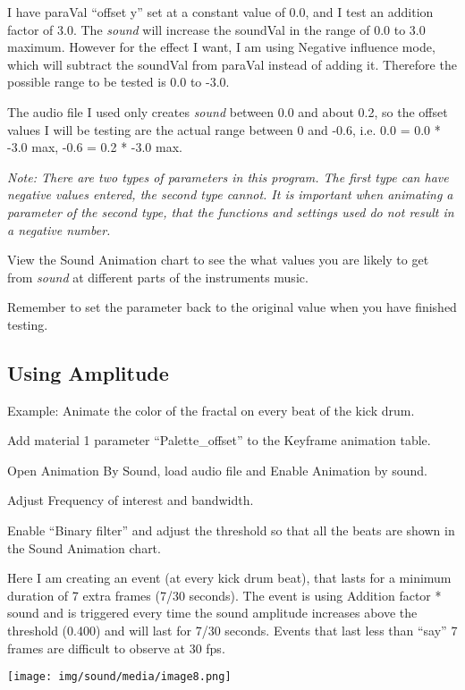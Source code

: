 I have paraVal ``offset y'' set at a constant value of 0.0, and I test
an addition factor of 3.0. The \emph{sound} will increase the soundVal
in the range of 0.0 to 3.0 maximum. However for the effect I want, I am
using Negative influence mode, which will subtract the soundVal from
paraVal instead of adding it. Therefore the possible range to be tested
is 0.0 to -3.0.

The audio file I used only creates \emph{sound} between 0.0 and about
0.2, so the offset values I will be testing are the actual range between
0 and -0.6, i.e. 0.0 = 0.0 * -3.0 max, -0.6 = 0.2 * -3.0 max.

\emph{Note: There are two types of parameters in this program. The first
type can have negative values entered, the second type cannot. It is}
\emph{important} \emph{when animating a parameter of the second type,
that the functions and settings used do not result in a negative
number.}

View the Sound Animation chart to see the what values you are likely to
get from \emph{sound} at different parts of the instruments music.

Remember to set the parameter back to the original value when you have
finished testing.

\subsection{Using Amplitude}\label{using-amplitude}

Example: Animate the color of the fractal on every beat of the kick
drum.

Add material 1 parameter ``Palette\_offset'' to the Keyframe animation
table.

Open Animation By Sound, load audio file and Enable Animation by sound.

Adjust Frequency of interest and bandwidth.

Enable ``Binary filter'' and adjust the threshold so that all the beats
are shown in the Sound Animation chart.

Here I am creating an event (at every kick drum beat), that lasts for a
minimum duration of 7 extra frames (7/30 seconds). The event is using
Addition factor * sound and is triggered every time the sound amplitude
increases above the threshold (0.400) and will last for 7/30 seconds.
Events that last less than ``say'' 7 frames are difficult to observe at
30 fps.

\texttt{[image: img/sound/media/image8.png]}

